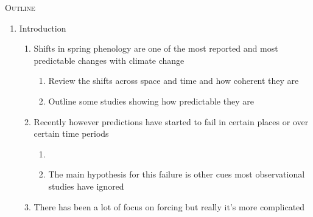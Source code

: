 \documentclass[11pt,letterpaper]{article}
\renewcommand{\section}[1]{%
\bigskip
\begin{center}
\begin{Large}
\normalfont\scshape #1
\medskip
\end{Large}
\end{center}}
\begin{document}
\section{Outline}
\begin{enumerate}
\item Introduction 
\begin{enumerate}
\item Shifts in spring phenology are one of the most reported and most predictable changes with climate change
\begin{enumerate}
\item Review the shifts across space and time and how coherent they are
\item Outline some studies showing how predictable they are \citep{Schwartz:1997nn,Ellwood2012} 
\end{enumerate}
\item Recently however predictions have started to fail in certain places or over certain time periods
\begin{enumerate}
\item \citet{yu2010,fu2015}  %
\item The main hypothesis for this failure is other cues most observational studies have ignored
\end{enumerate}
\item There has been a lot of focus on forcing but really it's more complicated

\end{enumerate}
\end{enumerate}
\end{document}
